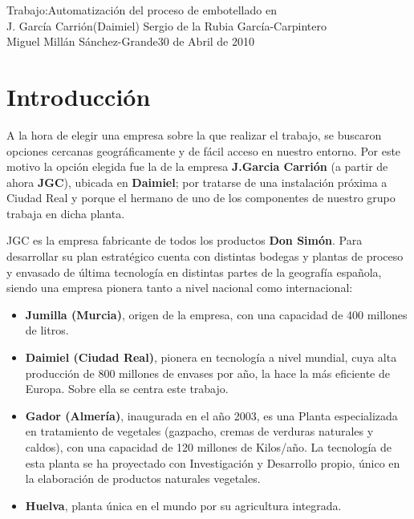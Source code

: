 \documentclass[11pt,a4paper,spanish,twoside]{report}
\begin{document}


{Trabajo:}{Automatización del proceso de embotellado en\\ J. García Carrión(Daimiel)}
{Sergio de la Rubia García-Carpintero\\Miguel Millán Sánchez-Grande}{30 de Abril de 2010}


\tableofcontents


\chapter{Introducción}
A la hora de elegir una empresa sobre la que realizar el trabajo, se buscaron
opciones cercanas geográficamente y de fácil acceso en nuestro entorno. Por
este motivo la opción elegida fue la de la empresa \textbf{J.Garcia Ca\-rrión}
(a partir de ahora \textbf{JGC}), ubicada en \textbf{Daimiel}; por tratarse de
una instalación próxima a Ciudad Real y porque el hermano de uno de los 
componentes de nuestro grupo trabaja en dicha planta.

JGC es la empresa fabricante de todos los productos \textbf{Don Simón}.
Para desarrollar su plan estratégico cuenta con distintas bodegas y 
plantas de proceso y envasado de última tecnología en distintas partes de la
geografía española, siendo una empresa pionera tanto a nivel nacional como
internacional:

\begin{itemize}
\item \textbf{Jumilla (Murcia)}, origen de la empresa, con una capacidad de 
400 millones de litros. 
\item \textbf{Daimiel (Ciudad Real)}, pionera en tecnología a nivel mundial, 
cuya alta producción de 800 millones de envases por año, la hace la más 
eficiente de Europa. Sobre ella se centra este trabajo.
\item \textbf{Gador (Almería)}, inaugurada en el año 2003, es una Planta 
especia\-li\-za\-da en tratamiento de vegetales (gazpacho, cremas de verduras
na\-tu\-ra\-les y caldos), con una capacidad de 120 millones de Kilos/año. La
tecnología de esta planta se ha proyectado con Investigación y Desarrollo 
propio, único en la elaboración de productos naturales vegetales. 
\item \textbf{Huelva}, planta única en el mundo por su agricultura integrada.
\end{itemize}
\end{document}
